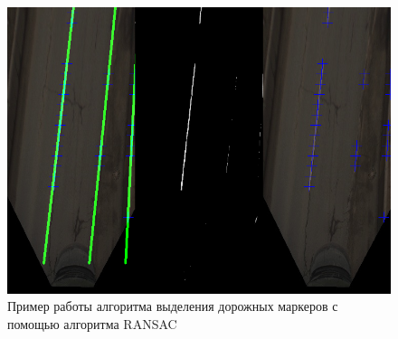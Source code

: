 \documentclass[aps,%
14pt,%
final,%
oneside,
onecolumn,%
musixtex, %
superscriptaddress,%
centertags]{extarticle} %
\begin{document}
\begin{figure}[]
     \includegraphics[width=\textwidth]{0000000026.png}
     \caption{Пример работы алгоритма выделения дорожных маркеров с помощью алгоритма RANSAC }
     \label{fig:ransac_markers}
\end{figure}
\newpage



\end{document}
